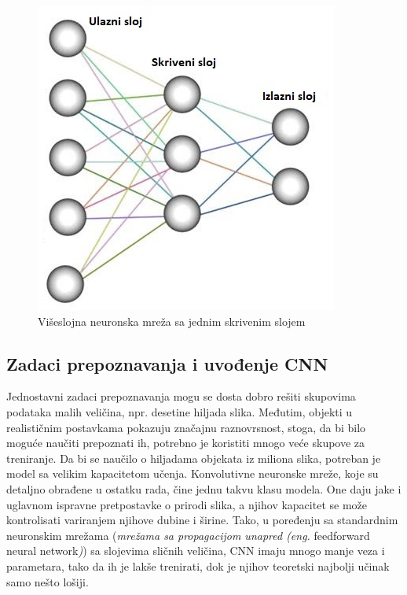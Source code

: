 \documentclass[a4paper]{article}
\begin{document}
\begin{figure}[h!]
\begin{center}
\includegraphics[scale=1]{neural_network_layers.jpeg}
\end{center}
\caption{Višeslojna neuronska mreža sa jednim skrivenim slojem}
\label{fig:neural_network_layers}
\end{figure}


\subsection{Zadaci prepoznavanja i uvođenje CNN}

Jednostavni zadaci prepoznavanja mogu se dosta dobro rešiti skupovima podataka malih veličina, npr. desetine hiljada slika. Međutim, objekti u realističnim postavkama pokazuju značajnu raznovrsnost, stoga, da bi bilo moguće naučiti prepoznati ih, potrebno je koristiti mnogo veće skupove za treniranje. Da bi se naučilo o hiljadama objekata iz miliona slika, potreban je model sa velikim kapacitetom učenja. Konvolutivne neuronske mreže, koje su detaljno obrađene u ostatku rada, čine jednu takvu klasu modela. One daju jake i uglavnom ispravne pretpostavke o prirodi slika, a njihov kapacitet se može kontrolisati variranjem njihove dubine i širine. Tako, u poređenju sa standardnim neuronskim mrežama (\textit{mrežama sa propagacijom unapred (eng.} feedforward neural network\textit{)}) sa slojevima sličnih veličina, CNN imaju mnogo manje veza i parametara, tako da ih je lakše trenirati, dok je njihov teoretski najbolji učinak samo nešto lošiji.
\end{document}
